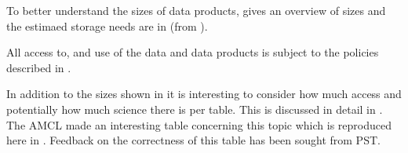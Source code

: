 To better understand the sizes of \RO data products,   gives an overview  of sizes and
the estimaed storage needs are in (from ).


\begin{landscape}



\end{landscape}

All access to, and use of the \RO data and data products is subject to the policies described in .

In addition to the sizes shown in  it is interesting to consider how much access and potentially how much science
there is per table. This is discussed in detail in . The \gls{AMCL} made an interesting table concerning this topic
which is reproduced here in . Feedback on the correctness of this table has been sought from \gls{PST}.

